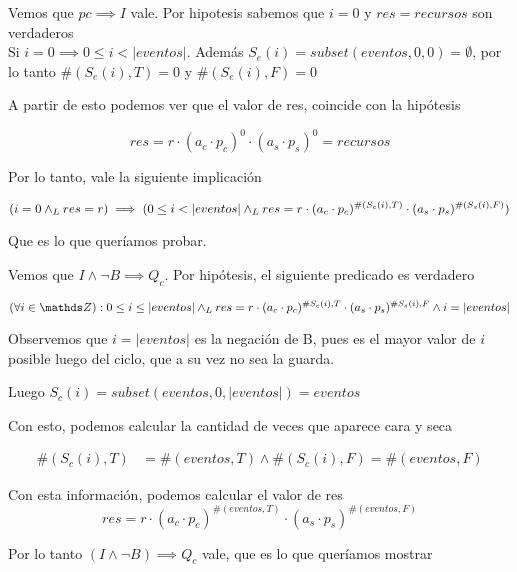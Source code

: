 \documentclass[../document.tex]{subfiles}
\begin{document}
Vemos que $pc\implies I$ vale. Por hipotesis sabemos que $i=0$ y $res=recursos$ son verdaderos\\

Si $i=0 \implies 0\leq i < |eventos|$. Además $S_e(i)=subset(eventos,0,0)=\emptyset$, por lo tanto $\#(S_e(i),T)=0$ y $\#(S_e(i),F)=0$

A partir de esto podemos ver que el valor de res, coincide con la hipótesis

\begin{equation}
res=r\cdot(a_c\cdot p_c)^0\cdot (a_s\cdot p_s)^0=recursos
\end{equation}

Por lo tanto, vale la siguiente implicación

\begin{equation}
(i=0 \land _L res=r)\implies (0\leq i < |eventos| \land _L res=r\cdot(a_c\cdot p_c)^{\#(S_c(i),T)}\cdot(a_s\cdot p_s)^{\#(S_s(i),F)})
\end{equation}

Que es lo que queríamos probar.

Vemos que $I\land ¬B \implies Q_c$. Por hipótesis, el siguiente predicado es verdadero

\begin{equation}
(\forall i \in \ent): 0 \leq i \leq |eventos| \yLuego res=r\cdot (a_c\cdot p_c)^{\#S_c(i),T}\cdot (a_s\cdot p_s)^{\#S_s(i),F}
\land i=|eventos|
\end{equation}

Observemos que $i=|eventos|$ es la negación de B, pues es el mayor valor de $i$ posible luego del ciclo, que a su vez no sea la guarda.

Luego $S_c(i)=subset(eventos, 0, |eventos|)=eventos$

Con esto, podemos calcular la cantidad de veces que aparece cara y seca 

\begin{equation}
\begin{split}
    \#(S_c(i),T)&=\#(eventos,T)\land \#(S_c(i),F)=\#(eventos,F)
\end{split}
\end{equation}

Con esta información, podemos calcular el valor de res
\begin{equation}
res=r\cdot (a_c\cdot p_c)^{\#(eventos,T)}\cdot (a_s\cdot p_s)^{\#(eventos,F)}
\end{equation}

Por lo tanto $(I\land¬B)\implies Q_c$ vale, que es lo que queríamos mostrar

\end{document}

